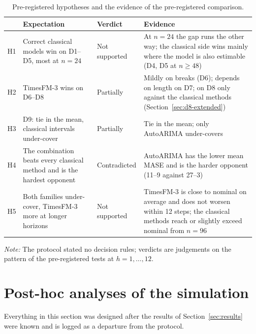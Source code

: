 \documentclass[ASNA]{USG}
\providecommand{\sectionref}[1]{Section~\ref{#1}}
\begin{document}
\begin{table}[!htbp]
\centering
\begin{threeparttable}
\caption{Pre-registered hypotheses and the evidence of the pre-registered comparison.}
\label{tab:hypotheses}
\small
\begin{tabular}{>{\raggedright\arraybackslash}p{0.6cm}>{\raggedright\arraybackslash}p{4.4cm}>{\raggedright\arraybackslash}p{2.0cm}>{\raggedright\arraybackslash}p{6.6cm}}
\toprule
 & Expectation & Verdict & Evidence \\
\midrule
H1 & Correct classical models win on D1--D5, most at $n = 24$ & Not supported & At $n = 24$ the gap runs the
  other way; the classical side wins mainly where the model is also estimable (D4, D5 at $n \geq 48$) \\[2pt]
H2 & TimesFM-3 wins on D6--D8 & Partially & Mildly on breaks (D6); depends on length on D7; on D8 only against
  the classical methods (\sectionref{sec:d8-extended}) \\[2pt]
H3 & D9: tie in the mean, classical intervals under-cover & Partially & Tie in the mean; only AutoARIMA
  under-covers \\[2pt]
H4 & The combination beats every classical method and is the hardest opponent & Contradicted & AutoARIMA has the
  lower mean MASE and is the harder opponent (11--9 against 27--3) \\[2pt]
H5 & Both families under-cover, TimesFM-3 more at longer horizons & Not supported & TimesFM-3 is close to nominal
  on average and does not worsen within 12 steps; the classical methods reach or slightly exceed nominal from $n = 96$ \\
\bottomrule
\end{tabular}
\begin{tablenotes}[flushleft]\footnotesize
\item \textit{Note:} The protocol stated no decision rules; verdicts are judgements on the pattern of the
pre-registered tests at $h = 1, \dots, 12$.
\end{tablenotes}
\end{threeparttable}
\end{table}

\section{Post-hoc analyses of the simulation}
\label{sec:posthoc}

Everything in this section was designed after the results of \sectionref{sec:results} were known and is
logged as a departure from the protocol.
\end{document}
